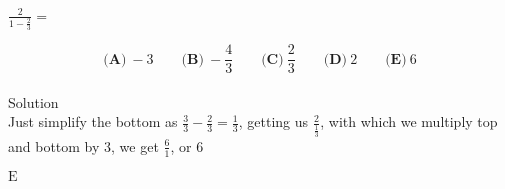 

$ \frac{2}{1-\frac{2}{3}}=$


\[ \textbf{(A)}\ -3 \qquad
\textbf{(B)}\ -\frac{4}{3} \qquad
\textbf{(C)}\ \frac{2}{3} \qquad
\textbf{(D)}\ 2 \qquad
\textbf{(E)}\ 6
\]
\\
Solution
\\
Just simplify the bottom as $\frac{3}{3}-\frac{2}{3}=\frac{1}{3}$, getting us $\frac{2}{\frac{1}{3}}$, with which we multiply top and bottom by 3, we get $\frac{6}{1}$, or $6$

$\boxed{\text{E}}$